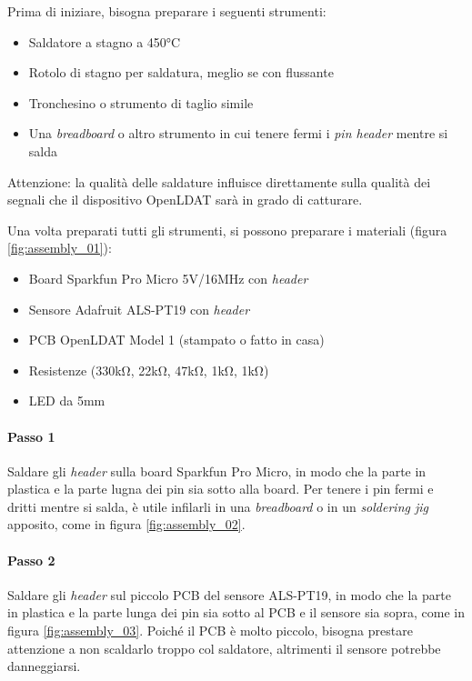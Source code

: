 Prima di iniziare, bisogna preparare i seguenti strumenti:
\begin{itemize}
	\item Saldatore a stagno a 450°C
	\item Rotolo di stagno per saldatura, meglio se con flussante
	\item Tronchesino o strumento di taglio simile
	\item Una \textit{breadboard} o altro strumento in cui tenere fermi i \textit{pin header} mentre si salda
\end{itemize}

Attenzione: la qualità delle saldature influisce direttamente sulla qualità dei segnali che il dispositivo OpenLDAT sarà in grado di catturare.

Una volta preparati tutti gli strumenti, si possono preparare i materiali (figura \ref{fig:assembly_01}):
\begin{itemize}
	\item Board Sparkfun Pro Micro 5V/16MHz con \textit{header}
	\item Sensore Adafruit ALS-PT19 con \textit{header}
	\item PCB OpenLDAT Model 1 (stampato o fatto in casa)
	\item Resistenze (330k\si{\ohm}, 22k\si{\ohm}, 47k\si{\ohm}, 1k\si{\ohm}, 1k\si{\ohm})
	\item LED da 5mm
\end{itemize}

\paragraph{Passo 1} Saldare gli \textit{header} sulla board Sparkfun Pro Micro, in modo che la parte in plastica e la parte lugna dei pin sia sotto alla board. Per tenere i pin fermi e dritti mentre si salda, è utile infilarli in una \textit{breadboard} o in un \textit{soldering jig} apposito, come in figura \ref{fig:assembly_02}.

\paragraph{Passo 2} Saldare gli \textit{header} sul piccolo PCB del sensore ALS-PT19, in modo che la parte in plastica e la parte lunga dei pin sia sotto al PCB e il sensore sia sopra, come in figura \ref{fig:assembly_03}. Poiché il PCB è molto piccolo, bisogna prestare attenzione a non scaldarlo troppo col saldatore, altrimenti il sensore potrebbe danneggiarsi.

